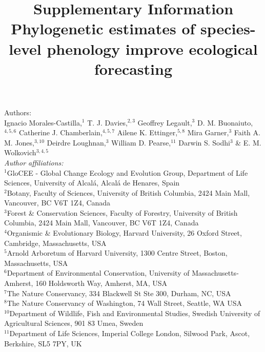 \documentclass[11pt]{article}
\begin{document}



\title{Supplementary Information\\
Phylogenetic estimates of species-level phenology improve ecological forecasting}
\author{} %
\maketitle


\noindent Authors:\\
Ignacio Morales-Castilla,$^{1}$ T. J. Davies,$^{2,3}$ Geoffrey Legault,$^{3}$ D. M. Buonaiuto,$^{4,5,6}$ Catherine J. Chamberlain,$^{4,5,7}$ Ailene K. Ettinger,$^{5,8}$ Mira Garner,$^{3}$ Faith A. M. Jones,$^{3,10}$ Deirdre Loughnan,$^{3}$ William D. Pearse,$^{11}$ Darwin S. Sodhi$^{3}$ \& E. M. Wolkovich$^{3,4,5}$  \vspace{2ex}\\
\emph{Author affiliations:}\\
$^{1}$GloCEE - Global Change Ecology and Evolution Group, Department of Life Sciences, University of Alcal\'a, Alcal\'a de Henares, Spain\\ %
 $^{2}$Botany, Faculty of Sciences, University of British Columbia, 2424 Main Mall, Vancouver, BC V6T 1Z4, Canada\\
$^{3}$Forest \& Conservation Sciences, Faculty of Forestry, University of British Columbia, 2424 Main Mall, Vancouver, BC V6T 1Z4, Canada\\
$^{4}$Organismic \& Evolutionary Biology, Harvard University, 26 Oxford Street, Cambridge, Massachusetts, USA\\
$^{5}$Arnold Arboretum of Harvard University, 1300 Centre Street, Boston, Massachusetts, USA\\
$^{6}$Department of Environmental Conservation, University of Massachusetts-Amherst, 160 Holdsworth Way, Amherst, MA, USA\\  %
 $^{7}$The Nature Conservancy, 334 Blackwell St Ste 300, Durham, NC, USA \\ %
$^{8}$The Nature Conservancy of Washington, 74 Wall Street, Seattle, WA  USA \\ %
$^{10}$Department of Wildlife, Fish and Environmental Studies, Swedish University of Agricultural Sciences, 901 83 Umea, Sweden\\ %
$^{11}$Department of Life Sciences, Imperial College London, Silwood Park, Ascot, Berkshire, SL5 7PY, UK\\
\end{document}
